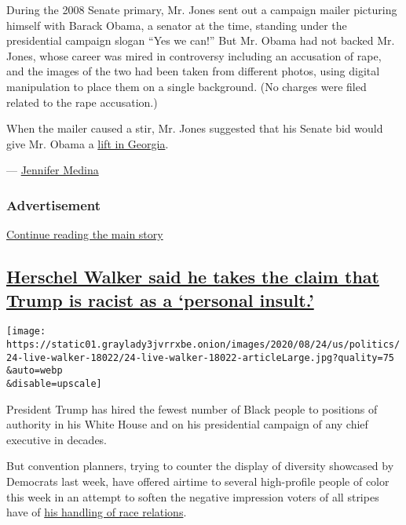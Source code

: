 During the 2008 Senate primary, Mr. Jones sent out a campaign mailer
picturing himself with Barack Obama, a senator at the time, standing
under the presidential campaign slogan ``Yes we can!'' But Mr. Obama had
not backed Mr. Jones, whose career was mired in controversy including an
accusation of rape, and the images of the two had been taken from
different photos, using digital manipulation to place them on a single
background. (No charges were filed related to the rape accusation.)

When the mailer caused a stir, Mr. Jones suggested that his Senate bid
would give Mr. Obama a
\href{https://www.nytimes3xbfgragh.onion/2008/07/16/us/politics/16georgia.html?searchResultPosition=1}{lift
in Georgia}.

---
\href{https://www.nytimes3xbfgragh.onion/by/jennifer-medina}{Jennifer
Medina}

\hypertarget{advertisement-4}{%
\subsubsection{Advertisement}\label{advertisement-4}}

\protect\hyperlink{after-dfp-ad-mid5}{Continue reading the main story}

\hypertarget{herschel-walker-said-he-takes-the-claim-that-trump-is-racist-as-a-personal-insult}{%
\subsection{\texorpdfstring{\protect\hyperlink{herschel-walker-said-he-takes-the-claim-that-trump-is-racist-as-a-personal-insult}{Herschel
Walker said he takes the claim that Trump is racist as a `personal
insult.'}}{Herschel Walker said he takes the claim that Trump is racist as a `personal insult.'}}\label{herschel-walker-said-he-takes-the-claim-that-trump-is-racist-as-a-personal-insult}}

\texttt{[image: https://static01.graylady3jvrrxbe.onion/images/2020/08/24/us/politics/24-live-walker-18022/24-live-walker-18022-articleLarge.jpg?quality=75\\\&auto=webp\\\&disable=upscale]}

President Trump has hired the fewest number of Black people to positions
of authority in his White House and on his presidential campaign of any
chief executive in decades.

But convention planners, trying to counter the display of diversity
showcased by Democrats last week, have offered airtime to several
high-profile people of color this week in an attempt to soften the
negative impression voters of all stripes have of
\href{https://abcnews.go.com/Politics/trump-trouble-thirds-americans-disapprove-handling-covid-19/story?id=72088513}{his
handling of race relations}.

